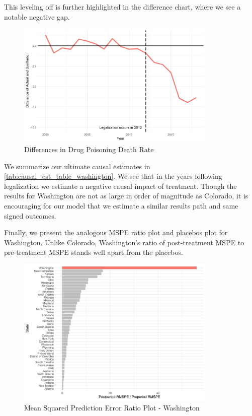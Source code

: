 \documentclass{article}
\begin{document}
This leveling off is further highlighted in the difference chart, where we see a notable negative gap.

\begin{figure}[H]
	\begin{center}
		\includegraphics[width=0.85\textwidth]{diffs_plot_washington}
	\end{center}
	\caption{Differences in Drug Poisoning Death Rate}
	\label{fig:diffs_plot_washington}
\end{figure}

We summarize our ultimate causal estimates in \ref{tab:causal_est_table_washington}. We see that in the years following legalization we estimate a negative causal impact of treatment. Though the results for Washington are not as large in order of magnitude as Colorado, it is encouraging for our model that we estimate a similar results path and same signed outcomes.



Finally, we present the analogous MSPE ratio plot and placebos plot for Washington. Unlike Colorado, Washington's ratio of post-treatment MSPE to pre-treatment MSPE stands well apart from the placebos. 

\begin{figure}[H]
	\begin{center}
		\includegraphics[width=0.85\textwidth]{mspe_plot_washington}
	\end{center}
	\caption{Mean Squared Prediction Error Ratio Plot - Washington}
	\label{fig:mspe_plot_washington}
\end{figure}
\end{document}
